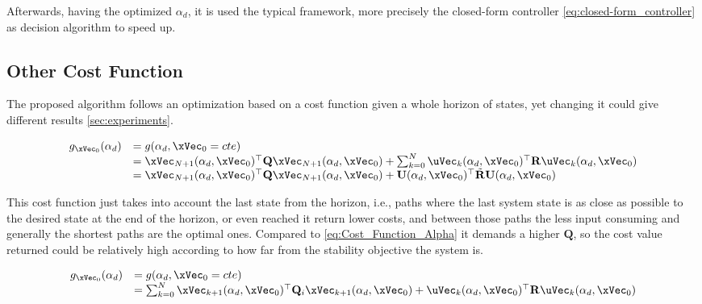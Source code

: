 Afterwards, having the optimized \(\alpha_d\), it is used the typical  framework, more precisely the closed-form controller \ref{eq:closed-form_controller} as decision algorithm to speed up.



\subsection{Other Cost Function}
\label{subsubsec:Other Cost Function}

The proposed algorithm follows an optimization based on a cost function given a whole horizon of states, yet changing it could give different results \ref{sec:experiments}. 

\begin{equation}
    \begin{array}{ll}
        g_{\xVec_0}(\alpha_d) &= g(\alpha_d, \xVec_0 = cte)  \\   
        &= \xVec_{N+1}(\alpha_d,\xVec_0)^{\top}\mathbf{Q}\xVec_{N+1}(\alpha_d,\xVec_0) + \sum_{k=0}^{N}  \uVec_k(\alpha_d,\xVec_0)^{\top}\mathbf{R}\uVec_k(\alpha_d,\xVec_0) \\
        &= \xVec_{N+1}(\alpha_d,\xVec_0)^{\top}\mathbf{Q}\xVec_{N+1}(\alpha_d,\xVec_0) +  \mathbf{U}(\alpha_d,\xVec_0)^{\top}\tilde{\mathbf{R}}\mathbf{U}(\alpha_d,\xVec_0)
    \end{array}
    \label{eq:Cost_Function_Alpha_last_state}
\end{equation}

This cost function just takes into account the last state from the horizon, i.e., paths where the last system state is as close as possible to the desired state at the end of the horizon, or even reached it return lower costs, and between those paths the less input consuming and generally the shortest paths are the optimal ones. Compared to \ref{eq:Cost_Function_Alpha} it demands a higher \(\mathbf{Q}\), so the cost value returned could be relatively high according to how far from the stability objective the system is.


\begin{equation}
    \begin{array}{ll}
        g_{\xVec_0}(\alpha_d) &= g(\alpha_d, \xVec_0 = cte)  \\   
        &= \sum_{k=0}^{N} \xVec_{k+1}(\alpha_d,\xVec_0)^{\top}\mathbf{Q}_i\xVec_{k+1}(\alpha_d,\xVec_0) +  \uVec_k(\alpha_d,\xVec_0)^{\top}\mathbf{R}\uVec_k(\alpha_d,\xVec_0)
    \end{array}
    \label{eq:Cost_Function_Alpha_evol_state}
\end{equation}

